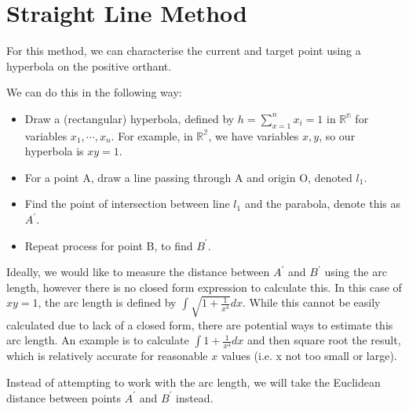 \documentclass[12pt,a4paper]{report}
\begin{document}


\section{Straight Line Method}
For this method, we can characterise the current and target point using a hyperbola on the positive orthant.

We can do this in the following way:

\begin{itemize}
    \item Draw a (rectangular) hyperbola, defined by $h = \sum_{x=1}^{n} x_{i} = 1$ in $\mathbb{R^n}$ for variables $x_{1}, \cdots, x_{n}$. For example, in $\mathbb{R^2}$, we have variables $x,y$, so our hyperbola is $xy = 1$.
    \item For a point A, draw a line passing through A and origin O, denoted $l_{1}$.
    \item Find the point of intersection between line $l_{1}$ and the parabola, denote this as $A^{'}$.
    \item Repeat process for point B, to find $B^{'}$.
\end{itemize}

Ideally, we would like to measure the distance between $A^{'}$ and $B^{'}$ using the arc length, however there is no closed form expression to calculate this. In this case of $xy = 1$, the arc length is defined by $\int \sqrt{1 + \frac{1}{x^4}} dx$. While this cannot be easily calculated due to lack of a closed form, there are potential ways to estimate this arc length. An example is to calculate $\int 1 + \frac{1}{x^4} dx$ and then square root the result, which is relatively accurate for reasonable $x$ values (i.e. x not too small or large).

Instead of attempting to work with the arc length, we will take the Euclidean distance between points $A^{'}$ and $B^{'}$ instead.
\end{document}
